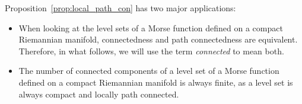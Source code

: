 Proposition~\ref{prop:local_path_con} has two major applications:
\begin{itemize}
\item When looking at the level sets of a Morse function defined on a compact Riemannian manifold, connectedness and path connectedness are equivalent. Therefore, in what follows, we will use the term \emph{connected} to mean both.
\item The number of connected components of a level set of a  Morse function defined on a compact Riemannian manifold is always finite, as a level set is always compact and locally path connected.
\end{itemize}





















